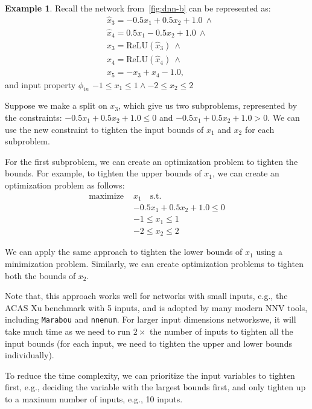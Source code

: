 \documentclass[oneside,11pt,dvipsnames]{book}
\numberwithin{equation}{section}
\theoremstyle{definition}
\newtheorem{example}{Example}[section]
\theoremstyle{remark}
\newcommand{\nnenum}{\texttt{nnenum}}
\newcommand{\marabou}{\texttt{Marabou}}
\newcommand{\relu}[1]{\mathrm{ReLU}\left(#1\right)}
\begin{document}
\begin{example}\label{ex:inputboundstigthten}
Recall the network from~\autoref{fig:dnn-b} can be represented as:
\[
\begin{aligned}
& \hat{x}_3 = -0.5x_1 + 0.5x_2 + 1.0 ~\land\\
& \hat{x}_4 = 0.5x_1 - 0.5x_2 + 1.0 ~\land\\
& x_3 = \relu{\hat{x}_3} ~\land \\
& x_4 = \relu{\hat{x}_4} ~\land \\
& x_5 = -x_3 + x_4 - 1.0,
\end{aligned}
\]
and input property $\phi_{in}$
\(
-1 \le x_1 \le 1 \land -2 \le x_2 \le 2
\)

Suppose we make a split on $x_3$, which give us two subproblems, represented by the constraints:
\(
    -0.5x_1 + 0.5x_2 + 1.0 \le 0
\)
and
\(
    -0.5x_1 + 0.5x_2 + 1.0 > 0
\).
We can use the new constraint to tighten the input bounds of $x_1$ and $x_2$ for each subproblem.

For the first subproblem, we can create an optimization problem to tighten the bounds.
For example, to tighten the upper bounds of $x_1$, we can create an optimization problem as follows:
\begin{equation}
\begin{aligned}
\text{maximize~} &x_1 \quad \text{s.t.} \\
& -0.5x_1 + 0.5x_2 + 1.0 \le 0 \\
& -1 \le x_1 \le 1 \\
& -2 \le x_2 \le 2
\end{aligned}
\end{equation}

We can apply the same approach to tighten the lower bounds of $x_1$ using a minimization problem.  Similarly, we can create optimization problems to tighten both the bounds of $x_2$.

\end{example}

Note that, this approach works well for networks with small inputs, e.g., the ACAS Xu benchmark with 5 inputs, and is adopted by many modern NNV tools, including \marabou{} and \nnenum{}.
For larger input dimensions networkswe, it will take much time as we need to run $2 \times$ the number of inputs to tighten all the input bounds (for each input, we need to tighten the upper and lower bounds individually).

To reduce the time complexity, we can prioritize the input variables to tighten first, e.g., deciding the variable with the largest bounds first, and only tighten up to a maxinum number of inputs, e.g., 10 inputs.
\end{document}
